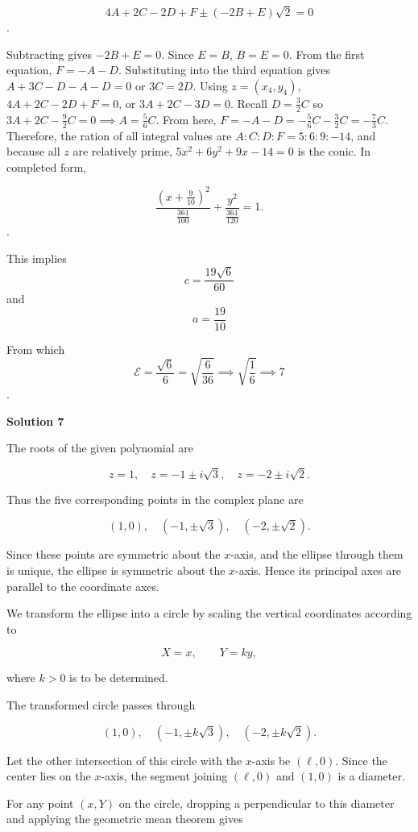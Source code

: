 \begin{enumerate}
 
 \[4A+2C-2D+F\pm(-2B+E)\sqrt2=0\].

 Subtracting gives $-2B+E=0$. Since $E=B$, $B=E=0$. From the first equation, $F=-A-D$. Substituting into the third equation gives $A+3C-D-A-D=0$ or $3C=2D$. Using $z = (x_4, y_4)$, $4A+2C-2D+F=0$, or $3A+2C-3D=0$. Recall $D = \frac{3}{2} C$ so $3A+2C-\frac{9}{2} C=0 \implies A=\frac{5}{6} C$. From here, $F=-A-D =-\frac56C-\frac32C=-\frac73C$. Therefore, the ration of all integral values are $A:C:D:F=5:6:9:-14$, and because all $z$ are relatively prime, $5x^2+6y^2+9x-14=0$ is the conic. In completed form,

 
 \[\frac{\left(x+\frac9{10}\right)^2}{\frac{361}{100}} +\frac{y^2}{\frac{361}{120}} =1.\].

 This implies
 \[c = \frac{19\sqrt6}{60}\] and 
 \[a = \frac{19}{10}\]

 From which 
 \[\mathcal{E} = \frac{\sqrt{6}}{6} = \sqrt{\frac{6}{36}} \implies \sqrt{\frac{1}{6}} \implies \boxed{7}\].

 



\textbf{Solution 7}

The roots of the given polynomial are

 
 \[z=1,\quad z=-1\pm i\sqrt3,\quad z=-2\pm i\sqrt2.\]

 Thus the five corresponding points in the complex plane are

 
 \[(1,0),\quad (-1,\pm\sqrt3),\quad (-2,\pm\sqrt2).\]

 Since these points are symmetric about the $x$-axis, and the ellipse through them is unique, the ellipse is symmetric about the $x$-axis. Hence its principal axes are parallel to the coordinate axes.

 We transform the ellipse into a circle by scaling the vertical coordinates according to

 
 \[X=x,\qquad Y=ky,\]

 where $k>0$ is to be determined.

 The transformed circle passes through

 
 \[(1,0),\quad (-1,\pm k\sqrt3),\quad (-2,\pm k\sqrt2).\]

 Let the other intersection of this circle with the $x$-axis be $(\ell,0)$. Since the center lies on the $x$-axis, the segment joining $(\ell,0)$ and $(1,0)$ is a diameter.

 For any point $(x,Y)$ on the circle, dropping a perpendicular to this diameter and applying the geometric mean theorem gives


\end{enumerate}
